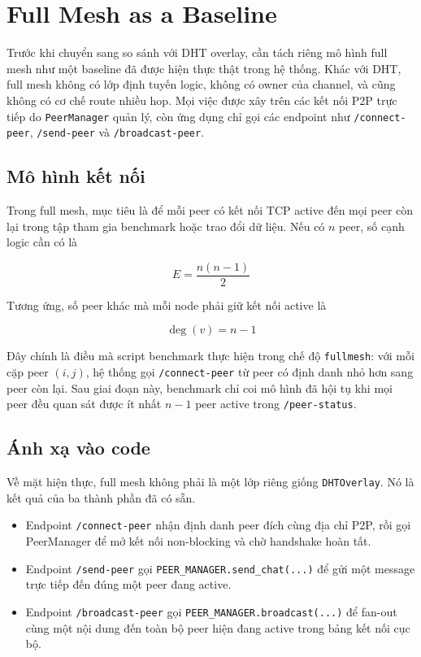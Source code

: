\section{Full Mesh as a Baseline}
Trước khi chuyển sang so sánh với DHT overlay, cần tách riêng mô hình full mesh như một baseline đã được hiện thực thật trong hệ thống. Khác với DHT, full mesh không có lớp định tuyến logic, không có owner của channel, và cũng không có cơ chế route nhiều hop. Mọi việc được xây trên các kết nối P2P trực tiếp do \texttt{PeerManager} quản lý, còn ứng dụng chỉ gọi các endpoint như \texttt{/connect-peer}, \texttt{/send-peer} và \texttt{/broadcast-peer}.

\subsection{Mô hình kết nối}
Trong full mesh, mục tiêu là để mỗi peer có kết nối TCP active đến mọi peer còn lại trong tập tham gia benchmark hoặc trao đổi dữ liệu. Nếu có $n$ peer, số cạnh logic cần có là
\begin{center}
\[
E = \frac{n(n-1)}{2}
\]
\end{center}

Tương ứng, số peer khác mà mỗi node phải giữ kết nối active là
\begin{center}
\[
\deg(v) = n - 1
\]
\end{center}

Đây chính là điều mà script benchmark thực hiện trong chế độ \texttt{fullmesh}: với mỗi cặp peer \((i, j)\), hệ thống gọi \texttt{/connect-peer} từ peer có định danh nhỏ hơn sang peer còn lại. Sau giai đoạn này, benchmark chỉ coi mô hình đã hội tụ khi mọi peer đều quan sát được ít nhất \(n-1\) peer active trong \texttt{/peer-status}.

\subsection{Ánh xạ vào code}
Về mặt hiện thực, full mesh không phải là một lớp riêng giống \texttt{DHTOverlay}. Nó là kết quả của ba thành phần đã có sẵn.
\begin{itemize}[leftmargin=2em]
    \item Endpoint \texttt{/connect-peer} nhận định danh peer đích cùng địa chỉ P2P, rồi gọi PeerManager để mở kết nối non-blocking và chờ handshake hoàn tất.
    \item Endpoint \texttt{/send-peer} gọi \texttt{PEER\_MANAGER.send\_chat(...)} để gửi một message trực tiếp đến đúng một peer đang active.
    \item Endpoint \texttt{/broadcast-peer} gọi \texttt{PEER\_MANAGER.broadcast(...)} để fan-out cùng một nội dung đến toàn bộ peer hiện đang active trong bảng kết nối cục bộ.
\end{itemize}

